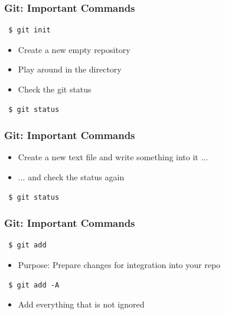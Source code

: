 \documentclass{beamer} %
\begin{document}
\begin{frame}[t, fragile]
\frametitle{Git: Important Commands}

\begin{verbatim} 
 $ git init
\end{verbatim}

\begin{itemize}
    \setlength\itemsep{1em}
	\item Create a new empty repository
    \item Play around in the directory
    \item Check the git status
\end{itemize}

\begin{verbatim} 
 $ git status
\end{verbatim}
\end{frame}

\begin{frame}[t, fragile]
\frametitle{Git: Important Commands}

\begin{itemize}
    \setlength\itemsep{1em}
    \item Create a new text file and write something into it ...
    \item ... and check the status again
\end{itemize}

\begin{verbatim} 
 $ git status
\end{verbatim}

\end{frame}


\begin{frame}[t, fragile]
\frametitle{Git: Important Commands}

\begin{verbatim} 
 $ git add
\end{verbatim}

\begin{itemize}
    \setlength\itemsep{1em}
	\item Purpose: Prepare changes for integration into your repo
\end{itemize}


\begin{verbatim} 
 $ git add -A
\end{verbatim}

\begin{itemize}
    \setlength\itemsep{1em}
	\item Add everything that is not ignored
\end{itemize}


\end{frame}
\end{document}
